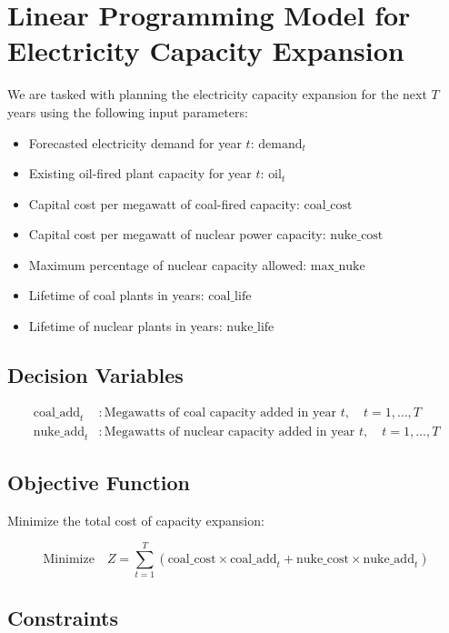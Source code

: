 \documentclass{article}
\begin{document}
\section*{Linear Programming Model for Electricity Capacity Expansion}

We are tasked with planning the electricity capacity expansion for the next \( T \) years using the following input parameters:

\begin{itemize}
    \item Forecasted electricity demand for year \( t \): \( \text{demand}_t \)
    \item Existing oil-fired plant capacity for year \( t \): \( \text{oil}_t \)
    \item Capital cost per megawatt of coal-fired capacity: \( \text{coal\_cost} \)
    \item Capital cost per megawatt of nuclear power capacity: \( \text{nuke\_cost} \)
    \item Maximum percentage of nuclear capacity allowed: \( \text{max\_nuke} \)
    \item Lifetime of coal plants in years: \( \text{coal\_life} \)
    \item Lifetime of nuclear plants in years: \( \text{nuke\_life} \)
\end{itemize}

\subsection*{Decision Variables}

\begin{align*}
    \text{coal\_add}_t & : \text{Megawatts of coal capacity added in year } t, \quad t = 1, \ldots, T \\
    \text{nuke\_add}_t & : \text{Megawatts of nuclear capacity added in year } t, \quad t = 1, \ldots, T 
\end{align*}

\subsection*{Objective Function}

Minimize the total cost of capacity expansion:

\[
\text{Minimize} \quad Z = \sum_{t=1}^{T} \left( \text{coal\_cost} \times \text{coal\_add}_t + \text{nuke\_cost} \times \text{nuke\_add}_t \right)
\]

\subsection*{Constraints}
\end{document}
